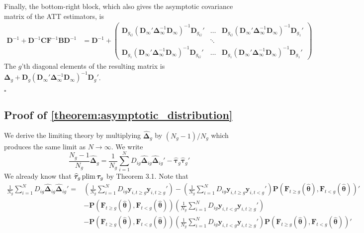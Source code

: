 Finally, the bottom-right block, which also gives the asymptotic covariance matrix of the ATT estimators, is 
\begin{align*}
    \bm D^{-1} + \bm D^{-1} \bm C \bm{F}^{-1} \bm B \bm D^{-1} 
    &= \bm D^{-1} + 
    \begin{pmatrix}
        \bm D_{g_G} (\bm D_{\infty}' \bm \Delta_{\infty}^{-1} \bm D_{\infty})^{-1} \bm D_{g_G}' & \hdots & \bm D_{g_G} (\bm D_{\infty}' \bm \Delta_{\infty}^{-1} \bm D_{\infty})^{-1} \bm D_{g_1}'\\
        & \ddots &\\
        \bm D_{g_1} (\bm D_{\infty}' \bm \Delta_{\infty}^{-1} \bm D_{\infty})^{-1} \bm D_{g_G}' & \hdots & \bm D_{g_1} (\bm D_{\infty}' \bm \Delta_{\infty}^{-1} \bm D_{\infty})^{-1} \bm D_{g_1}'
    \end{pmatrix}
\end{align*}
The $g$'th diagonal elements of the resulting matrix is $\bm \Delta_g + \bm D_g (\bm D_{\infty}' \bm \Delta_{\infty}^{-1} \bm D_{\infty})^{-1} \bm D_g'$.




$\square$




\subsection{Proof of \autoref{theorem:asymptotic_distribution}}

We derive the limiting theory by multiplying $\widehat{\bm \Delta}_g$ by $(N_g-1)/N_g$ which produces the same limit as $N \rightarrow \infty$. We write
\begin{equation*}
    \frac{N_g - 1}{ N_g} \widehat{\bm \Delta}_g = \frac{1}{N_g} \sum_{i = 1}^N D_{ig} \widehat{\bm \Delta}_{ig} \widehat{\bm \Delta}_{ig}' - \widehat{\bm \tau}_g \widehat{\bm \tau}_g'
\end{equation*}
We already know that $\widehat{\bm \tau}_g \operatorname{plim} \bm \tau_g$ by Theorem 3.1. Note that 
\begin{align*}
    \frac{1}{N_g} \sum_{i = 1}^N D_{ig} \widehat{\bm \Delta}_{ig} \widehat{\bm \Delta}_{ig}' = &\left( \frac{1}{N_g} \sum_{i = 1}^N D_{ig}  \bm y_{i, t \geq g} \bm y_{i, t \geq g}' \right) - \left( \frac{1}{N_g} \sum_{i = 1}^N D_{ig} \bm y_{i, t \geq g} \bm y_{i, t < g}' \right) \bm P(\bm{F}_{t \geq g}(\widehat{\bm{\theta}}), \bm{F}_{t < g}(\widehat{\bm{\theta}}))'\\
    &- \bm P(\bm{F}_{t \geq g}(\widehat{\bm{\theta}}), \bm{F}_{t < g}(\widehat{\bm{\theta}})) \left( \frac{1}{N_g} \sum_{i = 1}^N D_{ig} \bm y_{i, t < g} \bm y_{i, t \geq g}' \right)\\
    &- \bm P(\bm{F}_{t \geq g}(\widehat{\bm{\theta}}), \bm{F}_{t < g}(\widehat{\bm{\theta}})) \left( \frac{1}{N_g} \sum_{i = 1}^N D_{ig}  \bm y_{i, t < g} \bm y_{i, t \geq g}' \right) \bm P(\bm{F}_{t \geq g}(\widehat{\bm{\theta}}), \bm{F}_{t < g}(\widehat{\bm{\theta}}))'
\end{align*} 

